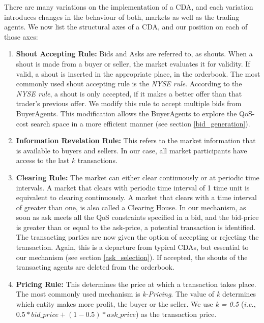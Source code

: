 \documentclass[10pt,journal,compsoc]{IEEEtran}
\begin{document}
There are many variations on the implementation of a CDA, and each variation introduces changes in the behaviour of both, markets as well as the trading agents. We now list the structural axes of a CDA, and our position on each of those axes:
\begin{enumerate}
	\item \textbf{Shout Accepting Rule:} Bids and Asks are referred to, as shouts. When a shout is made from a buyer or seller, the market evaluates it for validity. If valid, a shout is inserted in the appropriate place, in the orderbook. The most commonly used shout accepting rule is the \textit{NYSE rule}. According to the \textit{NYSE rule}, a shout is only accepted, if it makes a better offer than that trader's previous offer\cite{Vytelingum2006Structure}. We modify this rule to accept multiple bids from BuyerAgents. This modification allows the BuyerAgents to explore the QoS-cost search space in a more efficient manner (see section \ref{bid_generation}). 

	\item \textbf{Information Revelation Rule:} This refers to the market information that is available to buyers and sellers. In our case, all market participants have access to the last $k$ transactions.	
	
	\item \textbf{Clearing Rule:} The market can either clear continuously or at periodic time intervals. A market that clears with periodic time interval of 1 time unit is equivalent to clearing continuously. A market that clears with a time interval of greater than one, is also called a Clearing House. In our mechanism, as soon as ask meets all the QoS constraints specified in a bid, and the bid-price is greater than or equal to the ask-price, a potential transaction is identified. The transacting parties are now given the option of accepting or rejecting the transaction. Again, this is a departure from typical CDAs, but essential to our mechanism (see section \ref{ask_selection}). If accepted, the shouts of the transacting agents are deleted from the orderbook.
	
	\item \textbf{Pricing Rule:} This determines the price at which a transaction takes place. The most commonly used mechanism is \textit{k-Pricing}. The value of \textit{k} determines which entity makes more profit, the buyer or the seller. We use \textit{k = 0.5} (\textit{i.e.}, $0.5 * bid\_price + (1 - 0.5) * ask\_price$) as the transaction price. 	
	
\end{enumerate}
\end{document}
